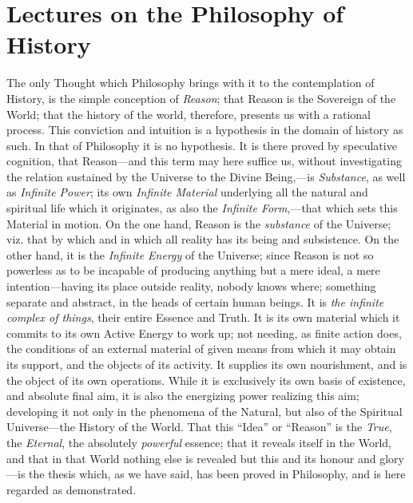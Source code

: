 
\author{G. W. F. Hegel}
\chapter[Lectures on the Philosophy of History, excerpt]{Lectures on
the Philosophy of History}

The only Thought which Philosophy brings with it to the
contemplation of History, is the simple conception of \textit{Reason};
that Reason is the Sovereign of the World; that the history of the
world, therefore, presents us with a rational process. This
conviction and intuition is a hypothesis in the domain of history as
such. In that of Philosophy it is no hypothesis. It is there proved by
speculative cognition, that Reason---and this term may here suffice
us, without investigating the relation sustained by the Universe to
the Divine Being,---is \textit{Substance}, as well as \textit{Infinite
Power}; its own \textit{Infinite Material} underlying all the natural
and spiritual life which it originates, as also the \textit{Infinite
Form},---that which sets this Material in motion. On the one hand,
Reason is the \textit{substance} of the Universe; viz. that by which
and in which all reality has its  being and subsistence. On
the other hand, it is the \textit{Infinite Energy} of the Universe;
since Reason is not so powerless as to be incapable of producing
anything but a mere ideal, a mere intention---having its place
outside reality, nobody knows where; something separate and abstract,
in the heads of certain human beings. It is \textit{the infinite
complex of things}, their entire Essence and Truth. It is its own
material which it commits to its own Active Energy to work up; not
needing, as finite action does, the conditions of an external material
of given means from which it may obtain its support, and the objects
of its activity. It supplies its own nourishment, and is the object of
its own operations. While it is exclusively its own basis of
existence, and absolute final aim, it is also the energizing power
realizing this aim; developing it not only in the phenomena of the
Natural, but also of the Spiritual Universe---the History of the
World. That this ``Idea'' or ``Reason'' is the \textit{True}, the
\textit{Eternal}, the absolutely \textit{powerful} essence; that it
reveals itself in the World, and that in that World nothing else is
revealed but this and its honour and glory---is the thesis which, as
we have said, has been proved in Philosophy, and is here regarded as
demonstrated.

